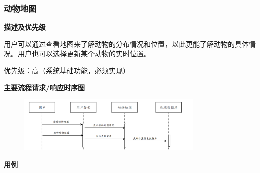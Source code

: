 \documentclass[12pt,a4paper,UTF8]{article}
\begin{document}
\subsubsection{动物地图}

\noindent\textbf{描述及优先级}

用户可以通过查看地图来了解动物的分布情况和位置，以此更能了解动物的具体情况。用户也可以选择更新某个动物的实时位置。

优先级：高（系统基础功能，必须实现）

\noindent\textbf{主要流程请求/响应时序图}

\begin{figure}[H]
  \centering
  \includegraphics[width=0.8\textwidth]{figures/use327.png}
\end{figure}

\noindent\textbf{用例}
\end{document}
